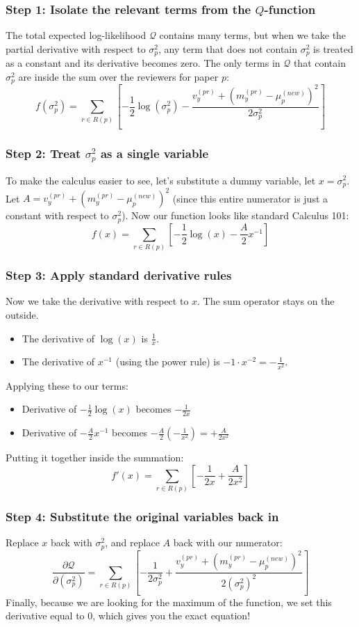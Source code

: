 \documentclass[twoside, 10pt]{article}
\begin{document}
\subsubsection*{Step 1: Isolate the relevant terms from the $Q$-function}
The total expected log-likelihood $\mathcal{Q}$ contains many terms, but when we take the partial derivative with respect to $\sigma_p^2$, any term that does not contain $\sigma_p^2$ is treated as a constant and its derivative becomes zero. The only terms in $\mathcal{Q}$ that contain $\sigma_p^2$ are inside the sum over the reviewers for paper $p$:
\[
f(\sigma_p^2) = \sum_{r \in R(p)} \left[ -\frac{1}{2}\log(\sigma_p^2) - \frac{v_y^{(pr)} + (m_y^{(pr)} - \mu_p^{(new)})^2}{2\sigma_p^2} \right]
\]
\subsubsection*{Step 2: Treat $\sigma_p^2$ as a single variable}
To make the calculus easier to see, let's substitute a dummy variable, let $x = \sigma_p^2$. Let $A = v_y^{(pr)} + (m_y^{(pr)} - \mu_p^{(new)})^2$ (since this entire numerator is just a constant with respect to $\sigma_p^2$). Now our function looks like standard Calculus 101:
\[
f(x) = \sum_{r \in R(p)} \left[ -\frac{1}{2}\log(x) - \frac{A}{2}x^{-1} \right]
\]
\subsubsection*{Step 3: Apply standard derivative rules}
Now we take the derivative with respect to $x$. The sum operator stays on the outside.
\begin{itemize}
    \item The derivative of $\log(x)$ is $\frac{1}{x}$.
    \item The derivative of $x^{-1}$ (using the power rule) is $-1 \cdot x^{-2} = -\frac{1}{x^2}$.
\end{itemize}
Applying these to our terms:
\begin{itemize}
    \item Derivative of $-\frac{1}{2}\log(x)$ becomes $-\frac{1}{2x}$
    \item Derivative of $-\frac{A}{2}x^{-1}$ becomes $-\frac{A}{2} \left(-\frac{1}{x^2}\right) = +\frac{A}{2x^2}$
\end{itemize}
Putting it together inside the summation:
\[
f'(x) = \sum_{r \in R(p)} \left[ -\frac{1}{2x} + \frac{A}{2x^2} \right]
\]
\subsubsection*{Step 4: Substitute the original variables back in}
Replace $x$ back with $\sigma_p^2$, and replace $A$ back with our numerator:
\[
\frac{\partial \mathcal{Q}}{\partial (\sigma_p^2)} = \sum_{r \in R(p)} \left[ -\frac{1}{2\sigma_p^2} + \frac{v_y^{(pr)} + (m_y^{(pr)} - \mu_p^{(new)})^2}{2(\sigma_p^2)^2} \right]
\]
Finally, because we are looking for the maximum of the function, we set this derivative equal to $0$, which gives you the exact equation!
\end{document}
